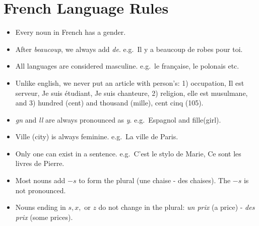 \section{French Language Rules}

\begin{itemize}

\item{Every noun in French has a gender.}

\item{After \emph{beaucoup}, we always add \emph{de}. e.g.\ Il y a beaucoup de
robes pour toi.}

\item{All languages are considered masculine. e.g.\ le fran\c{c}aise, le polonais
etc.}

\item{Unlike english, we never put an article with person's:
1) occupation, Il est serveur, Je suis \'etudiant, Je suis chanteure,
2) religion, elle est musulmane, and
3) hundred (cent) and thousand (mille), cent cinq (105).}

\item{\emph{gn} and \emph{ll} are always pronounced as \emph{y}. e.g.\ Espagnol and fille(girl).}

\item{Ville (city) is always feminine. e.g.\ La ville de Paris.}

\item{Only one can exist in a sentence. e.g.\ C'est le stylo de Marie, Ce sont les livres de Pierre.}

\item{Most nouns add $-s$ to form the plural (une chaise - des chaises).
The $-s$ is not pronounced.}

\item{Nouns ending in $s, x,$ or $z$ do not change in the plural:
\emph{un prix} (a price) - \emph{des prix} (some prices).}

\end{itemize}

